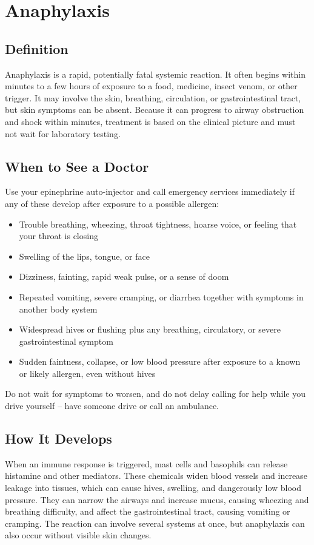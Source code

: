 \chapter{Anaphylaxis}

\section*{Definition}
Anaphylaxis is a rapid, potentially fatal systemic reaction. It often begins within minutes to a few hours of exposure to a food, medicine, insect venom, or other trigger. It may involve the skin, breathing, circulation, or gastrointestinal tract, but skin symptoms can be absent. Because it can progress to airway obstruction and shock within minutes, treatment is based on the clinical picture and must not wait for laboratory testing.

\section*{When to See a Doctor}
Use your epinephrine auto-injector and call emergency services immediately if any of these develop after exposure to a possible allergen:
\begin{itemize}
  \item Trouble breathing, wheezing, throat tightness, hoarse voice, or feeling that your throat is closing
  \item Swelling of the lips, tongue, or face
  \item Dizziness, fainting, rapid weak pulse, or a sense of doom
  \item Repeated vomiting, severe cramping, or diarrhea together with symptoms in another body system
  \item Widespread hives or flushing plus any breathing, circulatory, or severe gastrointestinal symptom
  \item Sudden faintness, collapse, or low blood pressure after exposure to a known or likely allergen, even without hives
\end{itemize}
Do not wait for symptoms to worsen, and do not delay calling for help while you drive yourself -- have someone drive or call an ambulance.

\section*{How It Develops}
When an immune response is triggered, mast cells and basophils can release histamine and other mediators. These chemicals widen blood vessels and increase leakage into tissues, which can cause hives, swelling, and dangerously low blood pressure. They can narrow the airways and increase mucus, causing wheezing and breathing difficulty, and affect the gastrointestinal tract, causing vomiting or cramping. The reaction can involve several systems at once, but anaphylaxis can also occur without visible skin changes.

